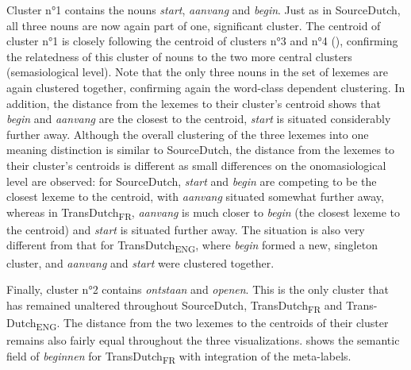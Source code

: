 Cluster n°1 contains the nouns \textit{start}, \textit{aanvang} and \textit{begin}. Just as in SourceDutch, all three nouns are now again part of one, significant cluster. The centroid of cluster n°1 is closely following the centroid of clusters n°3 and n°4 (), confirming the relatedness of this cluster of nouns to the two more central clusters (semasiological level). Note that the only three nouns in the set of lexemes are again clustered together, confirming again the word-class dependent clustering. In addition, the distance from the lexemes to their cluster’s centroid shows that \textit{begin} and \textit{aanvang} are the closest to the centroid, \textit{start} is situated considerably further away. Although the overall clustering of the three lexemes into one meaning distinction is similar to SourceDutch, the distance from the lexemes to their cluster’s centroids is different as small differences on the onomasiological level are observed: for SourceDutch, \textit{start} and \textit{begin} are competing to be the closest lexeme to the centroid, with \textit{aanvang} situated somewhat further away, whereas in TransDutch\textsubscript{FR}, \textit{aanvang} is much closer to \textit{begin} (the closest lexeme to the centroid) and \textit{start} is situated further away. The situation is also very different from that for TransDutch\textsubscript{ENG}, where \textit{begin} formed a new, singleton cluster, and \textit{aanvang} and \textit{start} were clustered together.

Finally, cluster n°2 contains \textit{ontstaan} and \textit{openen}. This is the only cluster that has remained unaltered throughout SourceDutch, TransDutch\textsubscript{FR} and Trans-\linebreak Dutch\textsubscript{ENG}. The distance from the two lexemes to the centroids of their cluster remains also fairly equal throughout the three visualizations.  shows the semantic field of \textit{beginnen} for TransDutch\textsubscript{FR} with integration of the meta-labels.

